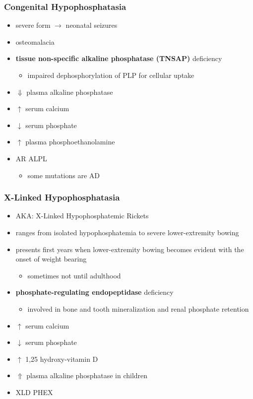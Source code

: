 \documentclass[12pt]{scrartcl}
\begin{document}
\subsubsection{Congenital Hypophosphatasia}
\label{sec:orgcb631b4}
\begin{itemize}
\item severe form \(\to\) neonatal seizures
\item osteomalacia
\item \textbf{tissue non-specific alkaline phosphatase (TNSAP)} deficiency
\begin{itemize}
\item impaired dephosphorylation of PLP for cellular uptake
\end{itemize}
\item \(\Downarrow\) plasma alkaline phosphatase
\item \(\uparrow\) serum calcium
\item \(\downarrow\) serum phosphate
\item \(\uparrow\) plasma phosphoethanolamine
\item AR ALPL
\begin{itemize}
\item some mutations are AD
\end{itemize}
\end{itemize}

\subsubsection{X-Linked Hypophosphatasia}
\label{sec:orgd7a6452}
\begin{itemize}
\item AKA: X-Linked Hypophosphatemic Rickets
\item ranges from isolated hypophosphatemia to severe lower-extremity bowing
\item presents first  years when lower-extremity bowing becomes
evident with the onset of weight bearing
\begin{itemize}
\item sometimes not until adulthood
\end{itemize}
\item \textbf{phosphate-regulating endopeptidase} deficiency
\begin{itemize}
\item involved in bone and tooth mineralization and renal phosphate retention
\end{itemize}
\item \(\uparrow\) serum calcium
\item \(\downarrow\) serum phosphate
\item \(\uparrow\) 1,25 hydroxy-vitamin D
\item \(\Uparrow\) plasma alkaline phosphatase in children
\item XLD PHEX
\end{itemize}
\end{document}
